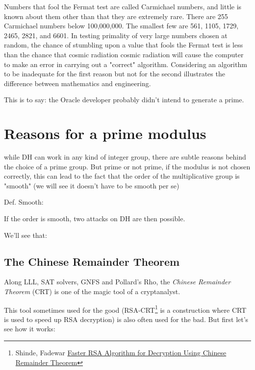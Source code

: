 \documentclass[a4paper,11pt]{article}
\begin{document}
\begin{displayquote}
Numbers that fool the Fermat test are called Carmichael numbers, and little is known about them other than that they are extremely rare. There are 255 Carmichael numbers below 100,000,000. The smallest few are 561, 1105, 1729, 2465, 2821, and 6601. In testing primality of very large numbers chosen at random, the chance of stumbling upon a value that fools the Fermat test is less than the chance that cosmic radiation cosmic radiation will cause the computer to make an error in carrying out a "correct" algorithm. Considering an algorithm to be inadequate for the first reason but not for the second illustrates the difference between mathematics and engineering.
\end{displayquote}

This is to say: the Oracle developer probably didn't intend to generate a prime.

\section{Reasons for a prime modulus}

while DH can work in any kind of integer group, there are subtle reasons behind the choice of a prime group. But prime or not prime, if the modulus is not chosen correctly, this can lead to the fact that the order of the multiplicative group is "smooth" (we will see it doesn't have to be smooth per se)

Def. Smooth:

If the order is smooth, two attacks on DH are then possible.

We'll see that:

\subsection{The Chinese Remainder Theorem}

Along LLL, SAT solvers, GNFS and Pollard's Rho, the \emph{Chinese Remainder Theorem} (CRT) is one of the magic tool of a cryptanalyst.

This tool sometimes used for the good (RSA-CRT\footnote{ Shinde, Fadewar \href{http://www.techscience.com/doi/10.3970/icces.2008.005.255.pdf}{Faster RSA Algorithm for Decryption Using Chinese
Remainder Theorem}}\cite{fasterRSA} is a construction where CRT is used to speed up RSA decryption) is also often used for the bad. But first let's see how it works:
\end{document}
